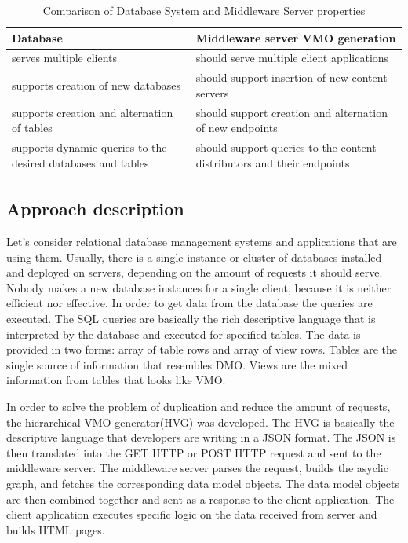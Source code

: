 \begin{table}
\begin{center}
  \begin{tabular}{||p{3in}|||p{3in}||}
    \hline
    Database & Middleware server VMO generation  \\ \hline
    serves multiple clients & should serve multiple client applications  \\ \hline
    supports creation of new databases & should support insertion of new content servers  \\ \hline
    supports creation and alternation of tables & should support creation and alternation of new endpoints  \\ \hline
    supports dynamic queries to the desired databases and tables & should support queries to the content distributors and their endpoints \\ \hline
    \hline
  \end{tabular}
  \caption{Comparison of Database System and Middleware Server properties}
  \label{table:db_ms}
\end{center}
\end{table}

\subsection{Approach description}

Let's consider relational database management systems and applications that are using them. Usually, there is a single instance or cluster of databases installed and deployed on servers, depending on the amount of requests it should serve. Nobody makes a new database instances for a single client, because it is neither efficient nor effective. In order to get data from the database the queries are executed. The SQL queries are basically the rich descriptive language that is interpreted by the database and executed for specified tables. The data is provided in two forms: array of table rows and array of view rows. Tables are the single source of information that resembles DMO. Views are the mixed information from tables that looks like VMO. 

In order to solve the problem of duplication and reduce the amount of requests, the hierarchical VMO generator(HVG) was developed. The HVG is basically the descriptive language that developers are writing in a JSON format. The JSON is then translated into the GET HTTP or POST HTTP request and sent to the middleware server. The middleware server parses the request, builds the asyclic graph, and fetches the corresponding data model objects. The data model objects are then combined together and sent as a response to the client application. The client application executes specific logic on the data received from server and builds HTML pages.

